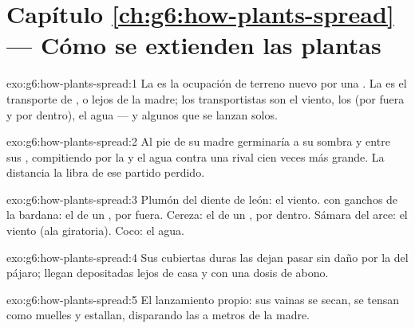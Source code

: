 \section*{Capítulo \ref{ch:g6:how-plants-spread} --- Cómo se extienden las plantas}

\begin{solution}{exo:g6:how-plants-spread:1}
La  es la ocupación de terreno nuevo por una . La
 es el transporte de ,  o  lejos de la
 madre; los transportistas son el viento, los  (por fuera
y por dentro), el agua --- y algunos  que se lanzan solos.
\end{solution}

\begin{solution}{exo:g6:how-plants-spread:2}
Al pie de su madre germinaría a su sombra y entre sus ,
compitiendo por la  y el agua contra una rival cien veces más
grande. La distancia la libra de ese partido perdido.
\end{solution}

\begin{solution}{exo:g6:how-plants-spread:3}
Plumón del diente de león: el viento.  con ganchos de la bardana:
el  de un , por fuera. Cereza: el  de un
, por dentro. Sámara del arce: el viento (ala giratoria). Coco:
el agua.
\end{solution}

\begin{solution}{exo:g6:how-plants-spread:4}
Sus cubiertas duras las dejan pasar sin daño por la  del
pájaro; llegan depositadas lejos de casa y con una dosis de abono.
\end{solution}

\begin{solution}{exo:g6:how-plants-spread:5}
El lanzamiento propio: sus vainas se secan, se tensan como muelles y
estallan, disparando las  a metros de la madre.
\end{solution}

